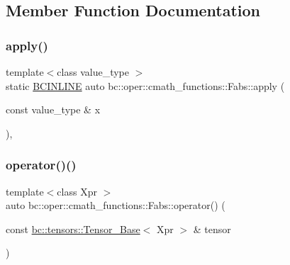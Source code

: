 \subsection{Member Function Documentation}
\mbox{\label{structbc_1_1oper_1_1cmath__functions_1_1Fabs_a1416b22883953e408e08d2c2f46e2018}} 
\subsubsection{\texorpdfstring{apply()}{apply()}}
{\footnotesize\ttfamily template$<$class value\+\_\+type $>$ \\
static \hyperlink{common_8h_a6699e8b0449da5c0fafb878e59c1d4b1}{B\+C\+I\+N\+L\+I\+NE} auto bc\+::oper\+::cmath\+\_\+functions\+::\+Fabs\+::apply (\begin{DoxyParamCaption}\item[{const value\+\_\+type \&}]{x }\end{DoxyParamCaption})\hspace{0.3cm}{\ttfamily [inline]}, {\ttfamily [static]}}

\mbox{\label{structbc_1_1oper_1_1cmath__functions_1_1Fabs_a039ff734277c7c78123daaf5bb19bcba}} 
\subsubsection{\texorpdfstring{operator()()}{operator()()}\hspace{0.1cm}{\footnotesize\ttfamily [1/3]}}
{\footnotesize\ttfamily template$<$class Xpr $>$ \\
auto bc\+::oper\+::cmath\+\_\+functions\+::\+Fabs\+::operator() (\begin{DoxyParamCaption}\item[{const \hyperlink{classbc_1_1tensors_1_1Tensor__Base}{bc\+::tensors\+::\+Tensor\+\_\+\+Base}$<$ Xpr $>$ \&}]{tensor }\end{DoxyParamCaption})\hspace{0.3cm}{\ttfamily [inline]}}

